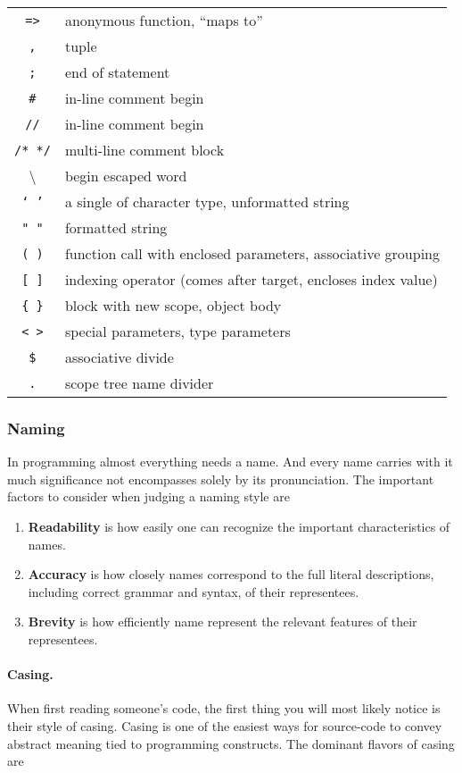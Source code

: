 \documentclass{article}
\newcommand{\code}[1]{\texttt{#1}}
\begin{document}
\begin{tabular}{c|l}
		\code{=>}	&anonymous function, ``maps to'' \\
		\code{,} 		&tuple \\
		\code{;}		&end of statement \\
		\code{\#}		&in-line comment begin \\
		\code{//} 		&in-line comment begin \\
		\code{/* */}   &multi-line comment block \\
		\textbackslash &begin escaped word \\
		\code{` '}	&a single of character type, unformatted string\\
		\code{" "}	&formatted string \\
		\code{( )} 	&function call with enclosed parameters, associative grouping \\
		\code{[ ]}	&indexing operator (comes after target, encloses index value)\\
		\code{\{ \}}	&block with new scope, object body \\
		\code{< >} &special parameters, type parameters \\
		\code{\$}		&associative divide \\
		\code{.}       &scope tree name divider
	\end{tabular}

\subsubsection{Naming}

	In programming almost everything needs a name. And every name carries with it much significance not encompasses solely by its pronunciation. The important factors to consider when judging a naming style are

	\begin{enumerate}
		\item \textbf{Readability} is how easily one can recognize the important characteristics of names.
		\item \textbf{Accuracy} is how closely names correspond to the full literal descriptions, including correct grammar and syntax, of their representees.
		\item \textbf{Brevity} is how efficiently name represent the relevant features of their representees.
	\end{enumerate}

	\paragraph{Casing.} When first reading someone's code, the first thing you will most likely notice is their style of casing. Casing is one of the easiest ways for source-code to convey abstract meaning tied to programming constructs. The dominant flavors of casing are
\end{document}
